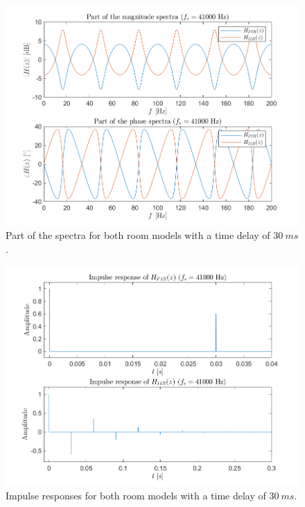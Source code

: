 \documentclass[journal]{IEEEtran}
\begin{document}
\begin{figure}
    \centering
    \includegraphics[width=\linewidth]{assignment_01/plots/bounce_spectra.png}
    \caption{Part of the spectra for both room models with a time delay of $\SI{30}{ms}$.}
    \label{fig:bounce:spectra}
\end{figure}
\begin{figure}
    \centering
    \includegraphics[width=\linewidth]{assignment_01/plots/bonuce_impulse.png}
    \caption{Impulse responses for both room models with a time delay of $\SI{30}{ms}$.}
    \label{fig:bounce:impulse}
\end{figure}
\end{document}
